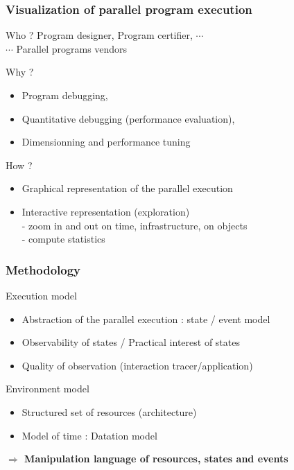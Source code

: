 \begin{frame}
\frametitle{Visualization of parallel program execution}
\begin{block}{Who ?}
 Program designer, 
 Program certifier, $\cdots$\\
\hfill $\cdots$ Parallel programs vendors
\end{block}
\pause
\begin{block}{Why ?}
\begin{itemize}
\item  Program debugging,  
\item Quantitative debugging (performance evaluation), 
\item Dimensionning and performance tuning
\end{itemize}
\end{block}
\pause
\begin{block}{How ? }
\begin{itemize}
\item Graphical representation of the parallel execution
\item Interactive representation (exploration)\\
- zoom in and out on time, infrastructure, on objects\\
- compute statistics
\end{itemize}
\end{block}
\end{frame}
\begin{frame}
\frametitle{Methodology}
\begin{block}{Execution model}
\begin{itemize}
\item Abstraction of the parallel execution : state / event model
\item Observability of states / Practical interest of states
\item Quality of observation (interaction tracer/application)
\end{itemize}
\end{block}
\begin{block}{Environment model}
\begin{itemize}
\item Structured set of resources (architecture)
\item Model of time : Datation model

\end{itemize}
\end{block}
\alert{\textbf{$\Rightarrow$ Manipulation language of resources, states and events}}
\end{frame}
